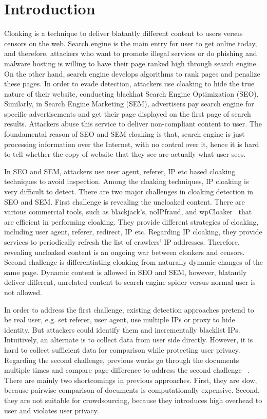 \section{Introduction}
\label{s:intro}

Cloaking is a technique to deliver blatantly different content to users versus
censors on the web. 
Search engine is the main entry for user to get online today, and therefore,
attackers who want to promote illegal services or do phishing and malware
hosting is willing to have their page ranked high through search engine.
On the other hand, search engine develops algorithms to rank pages and penalize
these pages. In order to evade detection, attackers use cloaking to hide the
true nature of their website, conducting blackhat Search Engine Optimization (SEO).
Similarly, in Search Engine Marketing (SEM), advertisers pay search engine for
specific advertisements and get their page displayed on the first page of search
results. Attackers abuse this service to deliver non-compliant content to user.
The foundamental reason of SEO and SEM cloaking is that, search engine is just processing
information over the Internet, with no control over it, hence it is hard to
tell whether the copy of website that they see are actually what user sees.

In SEO and SEM, attackers use user agent, referer, IP etc based cloaking
techniques to avoid inspection. Among the cloaking techniques, IP cloaking is
very difficult to detect. 
There are two major challenges in cloaking detection in SEO and SEM.
First challenge is revealing the uncloaked content. There are various
commercial tools, such as blackjack's, noIPfraud, and wpCloaker~\cite{intro:cloakware}
that are efficient in performing cloaking.
They provide different strategies of cloaking, including user agent, referer,
redirect, IP etc. Regarding IP cloaking, they provide services to periodically refresh the list of
crawlers' IP addresses. Therefore, revealing uncloaked content is an ongoing war
between cloakers and censors.
Second challenge is differentiating
cloaking from naturally dynamic changes of the same page. Dynamic content is
allowed in SEO and SEM, however, blatantly deliver different, unrelated content
to search engine spider versus normal user is not allowed.

In order to address the first challenge, existing detection approaches pretend to be real user, e.g. set
referer, user agent, use multiple IPs or proxy to hide identity. But
attackers could identify them and incrementally blacklist IPs.
Intuitively, an alternate is to collect data from user side directly. However, it is hard
to collect sufficient data for comparison while protecting user privacy.
Regarding the second challenge, previous works go through the documents multiple times and compare page
difference to address the second challenge ~\cite{lin2009detection,
chellapilla2006improving, deng2013uncovering, wang2011cloak}.
There are mainly two shortcomings in previous approaches.
First,  they are slow, because pairwise comparison of documents is
computationally expensive.
Second, they are not suitable for crowdsourcing, because they introduces
high overhead to user and violates user privacy. 

